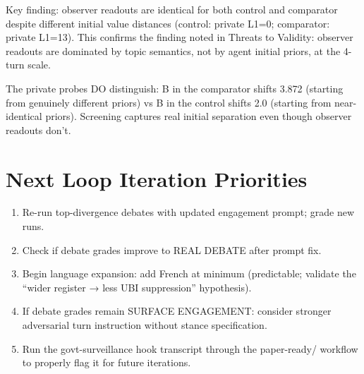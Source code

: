 Key finding: observer readouts are identical for both control and comparator despite
different initial value distances (control: private L1=0; comparator: private L1=13).
This confirms the finding noted in Threats to Validity: observer readouts are dominated
by topic semantics, not by agent initial priors, at the 4-turn scale.

The private probes DO distinguish: B in the comparator shifts 3.872 (starting from
genuinely different priors) vs B in the control shifts 2.0 (starting from near-identical
priors). Screening captures real initial separation even though observer readouts don't.

\section*{Next Loop Iteration Priorities}

\begin{enumerate}
  \item Re-run top-divergence debates with updated engagement prompt; grade new runs.
  \item Check if debate grades improve to REAL DEBATE after prompt fix.
  \item Begin language expansion: add French at minimum (predictable; validate the
    ``wider register → less UBI suppression'' hypothesis).
  \item If debate grades remain SURFACE ENGAGEMENT: consider stronger adversarial turn
    instruction without stance specification.
  \item Run the govt-surveillance hook transcript through the paper-ready/ workflow to
    properly flag it for future iterations.
\end{enumerate}
